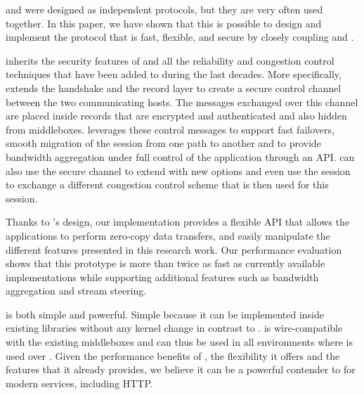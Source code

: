 \tcp and \tls were designed as independent protocols, but they are very often
used together. In this paper, we have shown that this is possible to design and
implement the \tcpls protocol that is fast, flexible, and secure by closely
coupling \tcp and \tls.

\tcpls inherits the security features of  and all the reliability and
congestion control techniques that have been added to \tcp during the last
decades. More specifically, \tcpls extends the  handshake and the record
layer to create a secure control channel between the two communicating hosts.
The messages exchanged over this channel are placed inside \tls records that are
encrypted and authenticated and also hidden from middleboxes. \tcpls leverages
these control messages to support fast failovers, smooth
migration of the \tcpls session from one path to another and to provide 
bandwidth aggregation under full control of the application through an API. 
\tcpls can also use the secure channel to extend \tcp with new options and even 
use the \tcpls session to exchange a different congestion control scheme that 
is then used for this session.

Thanks to \tcpls's design, our \tcpls implementation provides a
flexible API that allows the applications to perform zero-copy data transfers,
and easily manipulate the different features presented in this research work.
Our performance evaluation shows that this prototype is more than twice as fast
as currently available \quic implementations while supporting additional
features such as bandwidth aggregation and stream steering.

\tcpls is both simple and powerful. Simple because it can be implemented inside
existing \tls libraries without any kernel change in contrast to \tcp. \tcpls is
wire-compatible with the existing \tcp middleboxes and can thus be used in all
environments where  is used over \tcp. Given the performance benefits of
\tcpls, the flexibility it offers and the features that it already provides, we
believe it can be a powerful contender to \quic for modern services, including
HTTP.
